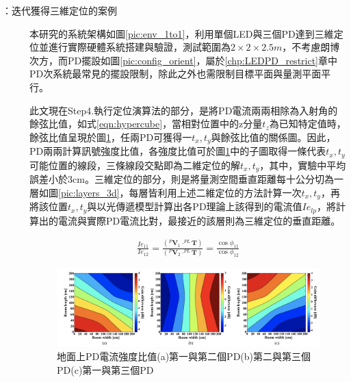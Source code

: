 \begin{description}




        \item[\cite{case:3d_layers}：迭代獲得三維定位的案例] \hfill 
        
        \qquad
        本研究的系統架構如圖\ref{pic:env_1to1}，利用單個LED與三個PD達到三維定位並進行實際硬體系統搭建與驗證，測試範圍為$2\times 2\times 2.5m$，不考慮朗博次方，而PD擺設如圖\ref{pic:config_orient}，屬於\ref{chp:LEDPD_restrict}章中PD次系統最常見的擺設限制，除此之外也需限制目標平面與量測平面平行。
        
        \qquad
        此文現在Step4.執行定位演算法的部分，是將PD電流兩兩相除為入射角的餘弦比值，如式\ref{eqn:hypercube}，當相對位置中的z分量$t_z$為已知特定值時，餘弦比值呈現於圖\ref{pic:layers_2d}，任兩PD可獲得一$t_x,t_y$與餘弦比值的關係圖。因此，PD兩兩計算訊號強度比值，各強度比值可於圖\ref{pic:layers_2d}中的子圖取得一條代表$t_x,t_y$可能位置的線段，三條線段交點即為二維定位的解$t_x,t_y$，其中，實驗中平均誤差小於3cm。三維定位的部分，則是將量測空間垂直距離每十公分切為一層如圖\ref{pic:layers_3d}，每層皆利用上述二維定位的方法計算一次$t_x,t_y$，再將該位置$t_x,t_y$與以光傳遞模型計算出各PD理論上該得到的電流值$Ie_{lp}$，將計算出的電流與實際PD電流比對，最接近的該層則為三維定位的垂直距離。

        \begin{equation}
            \label{eqn:hypercube}
            \begin{aligned}
                    \frac{Ie_{11}}{Ie_{12}}= 
                \frac{
                    ( ^{P}\boldsymbol{V}_1 \cdot 
                    ^{PL}\boldsymbol{T}
                    )
                } 
                    {
                        ( ^{P}\boldsymbol{V}_2 \cdot 
                                ^{PL}\boldsymbol{T}
                        )
                    }=\frac{\cos\phi_{11}}{\cos\phi_{12}}
            \end{aligned}
        \end{equation}

        \begin{figure}[htpb]
            \centering
            \includegraphics[width=12cm]{ch2pic/layers_2d.png}
            \caption{地面上PD電流強度比值(a)第一與第二個PD(b)第二與第三個PD(c)第一與第三個PD\cite{case:3d_layers}}
            \label{pic:layers_2d}
        \end{figure}


\end{description}
